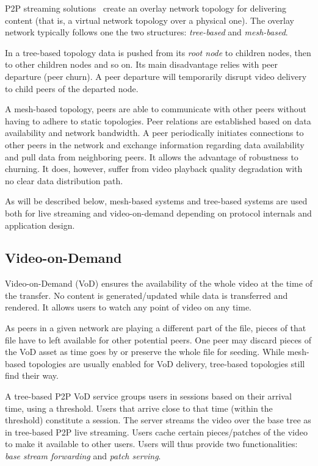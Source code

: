 P2P streaming solutions~\cite{p2p-streaming-survey} create an overlay network topology for
delivering content (that is, a virtual network topology over a physical one).
The overlay network typically follows one the two structures:
\textit{tree-based} and \textit{mesh-based}.

In a tree-based topology data is pushed from its \textit{root node} to
children nodes, then to other children nodes and so on. Its main disadvantage
relies with peer departure (peer churn). A peer departure will temporarily
disrupt video delivery to child peers of the departed node.

A mesh-based topology, peers are able to communicate with other peers without
having to adhere to static topologies. Peer relations are established based on
data availability and network bandwidth. A peer periodically initiates
connections to other peers in the network and exchange information regarding
data availability and pull data from neighboring peers. It allows the
advantage of robustness to churning. It does, however, suffer from video
playback quality degradation with no clear data distribution path.

As will be described below, mesh-based systems and tree-based systems are used
both for live streaming and video-on-demand depending on protocol internals
and application design.

\subsection{Video-on-Demand}
\label{subsec:p2p-systems:vod}

Video-on-Demand (VoD) ensures the availability of the whole video at the time
of the transfer. No content is generated/updated while data is transferred and
rendered. It allows users to watch any point of video on any time.

As peers in a given network are playing a different part of the file, pieces
of that file have to left available for other potential peers. One peer may
discard pieces of the VoD asset as time goes by or preserve the whole file for
seeding. While mesh-based topologies are usually enabled for VoD delivery,
tree-based topologies still find their way.

A tree-based P2P VoD service groups users in sessions based on their arrival
time, using a threshold. Users that arrive close to that time (within the
threshold) constitute a session. The server streams the video over the base
tree as in tree-based P2P live streaming. Users cache certain pieces/patches
of the video to make it available to other users. Users will thus provide two
functionalities: \textit{base stream forwarding} and \textit{patch serving}.

